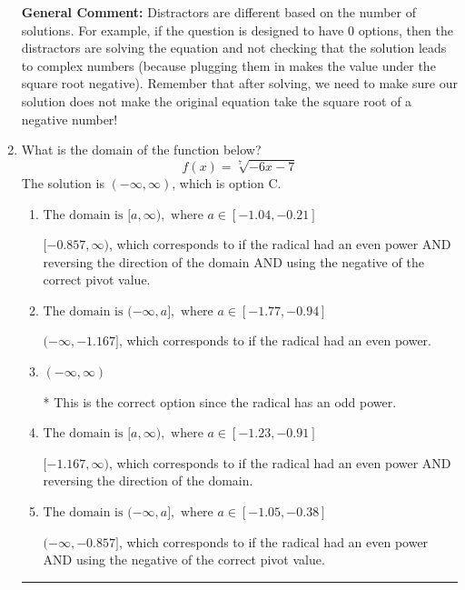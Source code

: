 \documentclass{extbook}[14pt]
\newcommand{\litem}[1]{\item #1

\rule{\textwidth}{0.4pt}}
\begin{document}
\begin{enumerate}
{\textbf{General Comment:} Distractors are different based on the number of solutions. For example, if the question is designed to have 0 options, then the distractors are solving the equation and not checking that the solution leads to complex numbers (because plugging them in makes the value under the square root negative). Remember that after solving, we need to make sure our solution does not make the original equation take the square root of a negative number!
}
\litem{
What is the domain of the function below?
\[ f(x) = \sqrt[7]{-6 x - 7} \]
The solution is \( (-\infty, \infty) \), which is option C.\begin{enumerate}[label=\Alph*.]
\item \( \text{The domain is } [a, \infty), \text{   where } a \in [-1.04, -0.21] \)

$[-0.857, \infty)$, which corresponds to if the radical had an even power AND reversing the direction of the domain AND using the negative of the correct pivot value.
\item \( \text{The domain is } (-\infty, a], \text{   where } a \in [-1.77, -0.94] \)

$(-\infty, -1.167]$, which corresponds to if the radical had an even power.
\item \( (-\infty, \infty) \)

* This is the correct option since the radical has an odd power.
\item \( \text{The domain is } [a, \infty), \text{   where } a \in [-1.23, -0.91] \)

$[-1.167, \infty)$, which corresponds to if the radical had an even power AND reversing the direction of the domain.
\item \( \text{The domain is } (-\infty, a], \text{   where } a \in [-1.05, -0.38] \)

$(-\infty, -0.857]$, which corresponds to if the radical had an even power AND using the negative of the correct pivot value.
\end{enumerate}

}
\end{enumerate}
\end{document}
